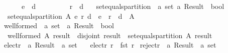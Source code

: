 \begin{isabellebody}
\ \ \ \ \ \ {\isacharparenleft}{\kern0pt}e\ {\isasyminter}\ d\ {\isacharequal}{\kern0pt}\ {\isacharbraceleft}{\kern0pt}{\isacharbraceright}{\kern0pt}{\isacharparenright}{\kern0pt}\ {\isasymand}\isanewline
\ \ \ \ \ \ {\isacharparenleft}{\kern0pt}r\ {\isasyminter}\ d\ {\isacharequal}{\kern0pt}\ {\isacharbraceleft}{\kern0pt}{\isacharbraceright}{\kern0pt}{\isacharparenright}{\kern0pt}{\isacharparenright}{\kern0pt}{\isachardoublequoteclose}\isanewline
\isanewline
{}\isamarkupfalse%
\ set{\isacharunderscore}{\kern0pt}equals{\isacharunderscore}{\kern0pt}partition\ {\isacharcolon}{\kern0pt}{\isacharcolon}{\kern0pt}\ {\isachardoublequoteopen}{\isacharprime}{\kern0pt}a\ set\ {\isasymRightarrow}{\isacharprime}{\kern0pt}a\ Result\ {\isasymRightarrow}\ bool{\isachardoublequoteclose}\ \isanewline
\ \ {\isachardoublequoteopen}set{\isacharunderscore}{\kern0pt}equals{\isacharunderscore}{\kern0pt}partition\ A\ {\isacharparenleft}{\kern0pt}e{\isacharcomma}{\kern0pt}\ r{\isacharcomma}{\kern0pt}\ d{\isacharparenright}{\kern0pt}\ {\isacharequal}{\kern0pt}\ {\isacharparenleft}{\kern0pt}e\ {\isasymunion}\ r\ {\isasymunion}\ d\ {\isacharequal}{\kern0pt}\ A{\isacharparenright}{\kern0pt}{\isachardoublequoteclose}\isanewline
\isanewline
{}\isamarkupfalse%
\ well{\isacharunderscore}{\kern0pt}formed\ {\isacharcolon}{\kern0pt}{\isacharcolon}{\kern0pt}\ {\isachardoublequoteopen}{\isacharprime}{\kern0pt}a\ set\ {\isasymRightarrow}\ {\isacharprime}{\kern0pt}a\ Result\ {\isasymRightarrow}\ bool{\isachardoublequoteclose}\ \isanewline
\ \ {\isachardoublequoteopen}well{\isacharunderscore}{\kern0pt}formed\ A\ result\ {\isacharequal}{\kern0pt}\ {\isacharparenleft}{\kern0pt}disjoint{}\ result\ {\isasymand}\ set{\isacharunderscore}{\kern0pt}equals{\isacharunderscore}{\kern0pt}partition\ A\ result{\isacharparenright}{\kern0pt}{\isachardoublequoteclose}\isanewline
\isanewline
\isanewline
{}\isamarkupfalse%
\ elect{\isacharunderscore}{\kern0pt}r\ {\isacharcolon}{\kern0pt}{\isacharcolon}{\kern0pt}\ {\isachardoublequoteopen}{\isacharprime}{\kern0pt}a\ Result\ {\isasymRightarrow}\ {\isacharprime}{\kern0pt}a\ set{\isachardoublequoteclose}\ \isanewline
\ \ {\isachardoublequoteopen}elect{\isacharunderscore}{\kern0pt}r\ r\ {\isasymequiv}\ fst\ r{\isachardoublequoteclose}\isanewline
\isanewline
{}\isamarkupfalse%
\ reject{\isacharunderscore}{\kern0pt}r\ {\isacharcolon}{\kern0pt}{\isacharcolon}{\kern0pt}\ {\isachardoublequoteopen}{\isacharprime}{\kern0pt}a\ Result\ {\isasymRightarrow}\ {\isacharprime}{\kern0pt}a\ set{\isachardoublequoteclose}\ \isanewline

\end{isabellebody}
